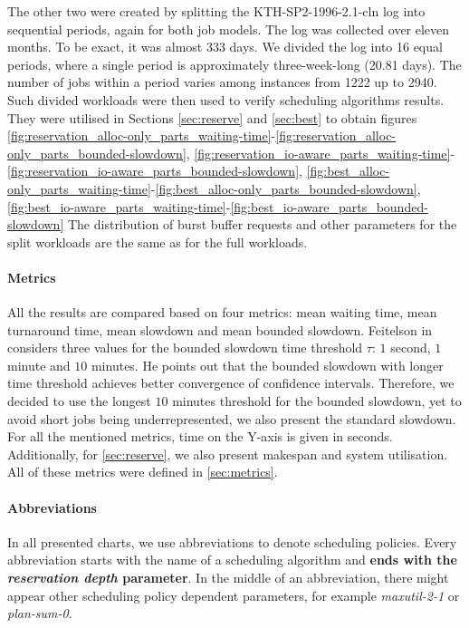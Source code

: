 \documentclass[thesis-en.tex]{subfiles}
\begin{document}
The other two were created by splitting the KTH-SP2-1996-2.1-cln log into sequential periods, again for both job models. The log was collected over eleven months. To be exact, it was almost 333 days. We divided the log into 16 equal periods, where a single period is approximately three-week-long (20.81 days). The number of jobs within a period varies among instances from 1222 up to 2940. Such divided workloads were then used to verify scheduling algorithms results. They were utilised in Sections \ref{sec:reserve} and \ref{sec:best} to obtain figures \ref{fig:reservation_alloc-only_parts_waiting-time}-\ref{fig:reservation_alloc-only_parts_bounded-slowdown}, \ref{fig:reservation_io-aware_parts_waiting-time}-\ref{fig:reservation_io-aware_parts_bounded-slowdown}, \ref{fig:best_alloc-only_parts_waiting-time}-\ref{fig:best_alloc-only_parts_bounded-slowdown}, \ref{fig:best_io-aware_parts_waiting-time}-\ref{fig:best_io-aware_parts_bounded-slowdown} The distribution of burst buffer requests and other parameters for the split workloads are the same as for the full workloads.

\paragraph{Metrics}
All the results are compared based on four metrics: mean waiting time, mean turnaround time, mean slowdown and mean bounded slowdown. Feitelson in \cite{10.1007/3-540-45540-X_11} considers three values for the bounded slowdown time threshold $\tau$: $1$ second, $1$ minute and $10$ minutes. He points out that the bounded slowdown with longer time threshold achieves better convergence of confidence intervals. Therefore, we decided to use the longest $10$ minutes threshold for the bounded slowdown, yet to avoid short jobs being underrepresented, we also present the standard slowdown. For all the mentioned metrics, time on the Y-axis is given in seconds. Additionally, for \autoref{sec:reserve}, we also present makespan and system utilisation. All of these metrics were defined in \autoref{sec:metrics}.

\paragraph{Abbreviations}
In all presented charts, we use abbreviations to denote scheduling policies. Every abbreviation starts with the name of a scheduling algorithm and \textbf{ends with the \emph{reservation depth} parameter}. In the middle of an abbreviation, there might appear other scheduling policy dependent parameters, for example \emph{maxutil-2-1} or \emph{plan-sum-0}.
\end{document}
